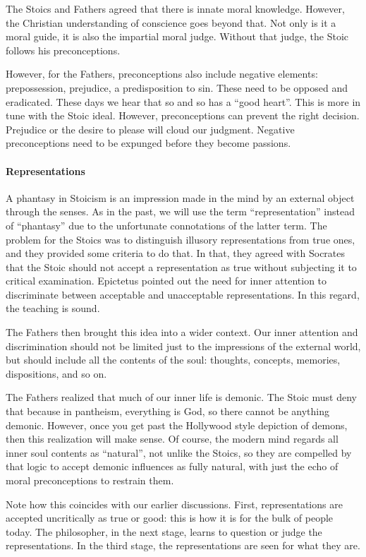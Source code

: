 The Stoics and Fathers agreed that there is innate moral knowledge. However, the Christian understanding of conscience
goes beyond that. Not only is it a moral guide, it is also the impartial moral judge. Without that judge, the Stoic
follows his preconceptions.

However, for the Fathers, preconceptions also include negative elements: prepossession, prejudice, a predisposition to
sin. These need to be opposed and eradicated. These days we hear that so and so has a “good heart”. This is more in
tune with the Stoic ideal. However, preconceptions can prevent the right decision. Prejudice or the desire to please
will cloud our judgment. Negative preconceptions need to be expunged before they become passions.

\paragraph{Representations}
A phantasy in Stoicism is an impression made in the mind by an external object through the senses. As in the past, we
will use the term “representation” instead of “phantasy” due to the unfortunate connotations of the latter term. The
problem for the Stoics was to distinguish illusory representations from true ones, and they provided some criteria to
do that. In that, they agreed with Socrates that the Stoic should not accept a representation as true without
subjecting it to critical examination. Epictetus pointed out the need for inner attention to discriminate between
acceptable and unacceptable representations. In this regard, the teaching is sound.

The Fathers then brought this idea into a wider context. Our inner attention and discrimination should not be limited
just to the impressions of the external world, but should include all the contents of the soul: thoughts, concepts,
memories, dispositions, and so on.

The Fathers realized that much of our inner life is demonic. The Stoic must deny that because in pantheism, everything
is God, so there cannot be anything demonic. However, once you get past the Hollywood style depiction of demons, then
this realization will make sense. Of course, the modern mind regards all inner soul contents as “natural”, not unlike
the Stoics, so they are compelled by that logic to accept demonic influences as fully natural, with just the echo of
moral preconceptions to restrain them.

Note how this coincides with our earlier discussions. First, representations are accepted uncritically as true or good:
this is how it is for the bulk of people today. The philosopher, in the next stage, learns to question or judge the
representations. In the third stage, the representations are seen for what they are.

